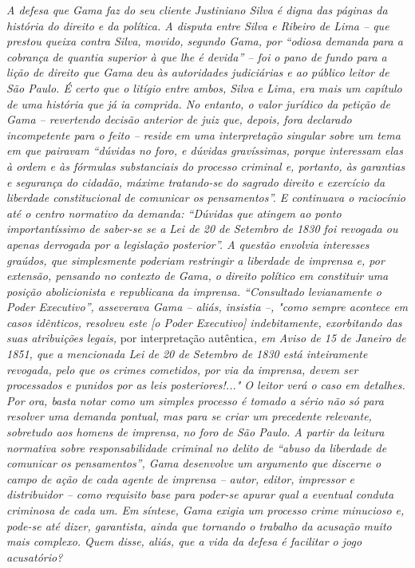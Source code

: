 \emph{A defesa que Gama faz do seu cliente Justiniano Silva é digna das
páginas da história do direito e da política. A disputa entre Silva e
Ribeiro de Lima -- que prestou queixa contra Silva, movido, segundo
Gama, por ``odiosa demanda para a cobrança de quantia superior à que lhe
é devida'' -- foi o pano de fundo para a lição de direito que Gama deu
às autoridades judiciárias e ao público leitor de São Paulo. É certo que
o litígio entre ambos, Silva e Lima, era mais um capítulo de uma
história que já ia comprida. No entanto, o valor jurídico da petição de
Gama -- revertendo decisão anterior de juiz que, depois, fora declarado
incompetente para o feito -- reside em uma interpretação singular sobre
um tema em que pairavam ``dúvidas no foro, e dúvidas gravíssimas, porque
interessam elas à ordem e às fórmulas substanciais do processo criminal
e, portanto, às garantias e segurança do cidadão, máxime tratando-se do
sagrado direito e exercício da liberdade constitucional de comunicar os
pensamentos''. E continuava o raciocínio até o centro normativo da
demanda: ``Dúvidas que atingem ao ponto importantíssimo de saber-se se a
Lei de 20 de Setembro de 1830 foi revogada ou apenas derrogada por a
legislação posterior''. A questão envolvia interesses graúdos, que
simplesmente poderiam restringir a liberdade de imprensa e, por
extensão, pensando no contexto de Gama, o direito político em constituir
uma posição abolicionista e republicana da imprensa. ``Consultado
levianamente o Poder Executivo'', asseverava Gama -- aliás, insistia --,
"como sempre acontece em casos idênticos, resolveu este {[}o Poder
Executivo{]} indebitamente, exorbitando das suas atribuições legais,}
por interpretação autêntica\emph{, em Aviso de 15 de Janeiro de 1851,
que a mencionada Lei de 20 de Setembro de 1830 está inteiramente
revogada, pelo que os crimes cometidos, por via da imprensa, devem ser
processados e punidos por as leis posteriores!..." O leitor verá o caso
em detalhes. Por ora, basta notar como um simples processo é tomado a
sério não só para resolver uma demanda pontual, mas para se criar um
precedente relevante, sobretudo aos homens de imprensa, no foro de São
Paulo. A partir da leitura normativa sobre responsabilidade criminal no
delito de ``abuso da liberdade de comunicar os pensamentos'', Gama
desenvolve um argumento que discerne o campo de ação de cada agente de
imprensa -- autor, editor, impressor e distribuidor -- como requisito
base para poder-se apurar qual a eventual conduta criminosa de cada um.
Em síntese, Gama exigia um processo crime minucioso e, pode-se até
dizer, garantista, ainda que tornando o trabalho da acusação muito mais
complexo. Quem disse, aliás, que a vida da defesa é facilitar o jogo
acusatório? }

